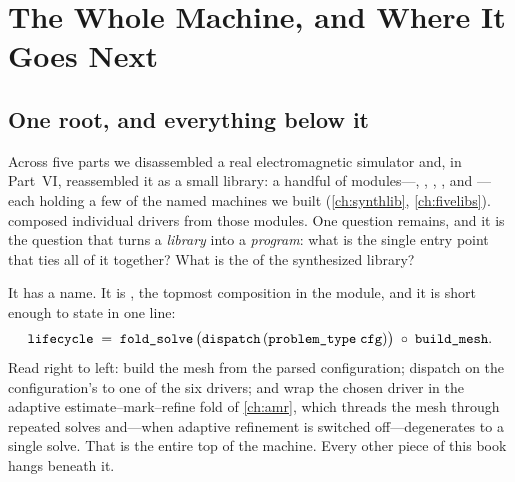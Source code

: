 \chapter{The Whole Machine, and Where It Goes Next}
\label{ch:wholemachine}


\section{One root, and everything below it}
\label{sec:wm-root}

Across five parts we disassembled a real electromagnetic simulator and, in Part~VI,
reassembled it as a small library: a handful of modules---,
, , , and ---each
holding a few of the named machines we built (\cref{ch:synthlib},
\cref{ch:fivelibs}).  composed individual drivers from those
modules. One question remains, and it is the question that turns a \emph{library}
into a \emph{program}: what is the single entry point that ties all of it together?
What is the  of the synthesized library?

It has a name. It is , the topmost composition in the 
module, and it is short enough to state in one line:
\begin{equation}
  \texttt{lifecycle} \;=\; \texttt{fold\_solve}\,\bigl(\texttt{dispatch}\,(\texttt{problem\_type}\;\texttt{cfg})\bigr)
                        \;\circ\; \texttt{build\_mesh}.
  \label{eq:wm-lifecycle}
\end{equation}
Read right to left: build the mesh from the parsed configuration; dispatch on the
configuration's  to one of the six drivers; and wrap the chosen
driver in the adaptive estimate--mark--refine fold of \cref{ch:amr}, which threads
the mesh through repeated solves and---when adaptive refinement is switched
off---degenerates to a single solve. That is the entire top of the machine. Every
other piece of this book hangs beneath it.

